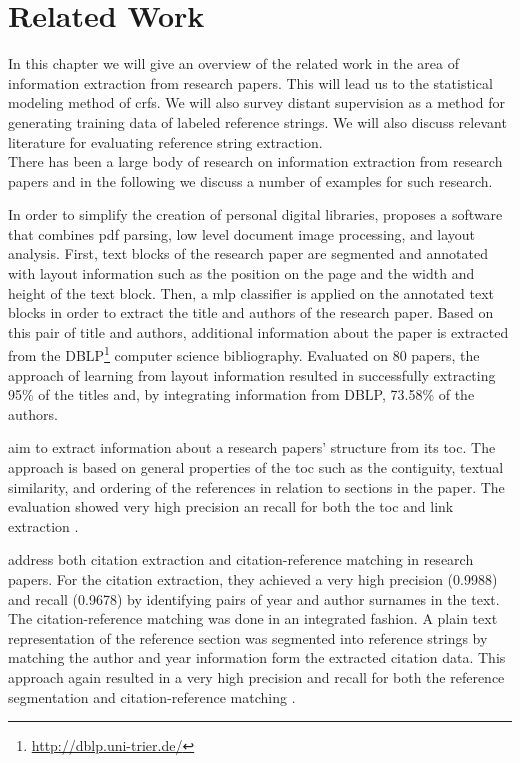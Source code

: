 \chapter{Related Work}\label{cha:related-work}
In this chapter we will give an overview of the related work in the area of information extraction from research papers.
This will lead us to the statistical modeling method of \glspl{crf}.
We will also survey distant supervision as a method for generating training data of labeled reference strings.
We will also discuss relevant literature for evaluating reference string extraction.\\

There has been a large body of research on information extraction from research papers and in the following we discuss a number of examples for such research.

In order to simplify the creation of personal digital libraries, \citet{marinai2009metadata} proposes a software that combines \gls{pdf} parsing, low level document image processing, and layout analysis.
First, text blocks of the research paper are segmented and annotated with layout information such as the position on the page and the width and height of the text block.
Then, a \gls{mlp} classifier is applied on the annotated text blocks in order to extract the title and authors of the research paper.
Based on this pair of title and authors, additional information about the paper is extracted from the DBLP\footnote{\url{http://dblp.uni-trier.de/}} computer science bibliography.
Evaluated on 80 papers, the approach of learning from layout information resulted in successfully extracting 95\% of the titles and, by integrating information from DBLP, 73.58\% of the authors.

\citet{dejean2005structuring} aim to extract information about a research papers' structure from its \gls{toc}.
The approach is based on general properties of the \gls{toc} such as the contiguity, textual similarity, and ordering of the references in relation to sections in the paper.
The evaluation showed very high precision an recall for both the \gls{toc} and link extraction \citep{dejean2005structuring}.

\citet{powley2007evidence} address both citation extraction and citation-reference matching in research papers.
For the citation extraction, they achieved a very high precision (0.9988) and recall (0.9678) by identifying pairs of year and author surnames in the text.
The citation-reference matching was done in an integrated fashion.
A plain text representation of the reference section was segmented into reference strings by matching the author and year information form the extracted citation data.
This approach again resulted in a very high precision and recall for both the reference segmentation and citation-reference matching \citep{powley2007evidence}.

